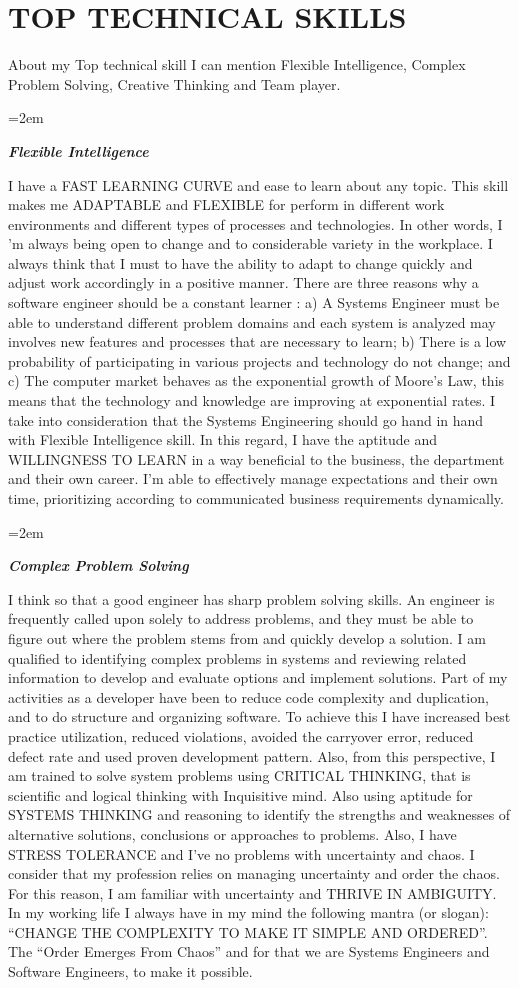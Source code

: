 \documentclass[paper=a4,fontsize=11pt]{scrartcl} %
\newlength{\spacebox}
\newcommand{\sepspace}{\vspace*{1em}}		%
\newcommand{\NewPart}[1]{\section*{\uppercase{#1}}}
\newcommand{\PersonalEntry}[2]{
		\noindent\hangindent=2em\hangafter=0 %
		\parbox{\spacebox}{        %
		\textit{#1}}		       %
		\hspace{1.5em} #2 \par}    %
\newcommand{\SkillsEntry}[2]{      %
		\noindent\hangindent=2em\hangafter=0 %
		\parbox{\spacebox}{        %
		\textit{#1}}			   %
		\hspace{1.5em} #2 \par}    %
\begin{document}
\NewPart{Top Technical Skills}{
About my Top technical skill I can mention Flexible Intelligence, Complex Problem Solving, Creative Thinking and Team player.
}

\sepspace

\SkillsEntry{\large{\textbf{Flexible Intelligence}}}{
I have a FAST LEARNING CURVE and ease to learn about any topic. This skill makes me ADAPTABLE and FLEXIBLE for perform in different work environments and different types of processes and technologies. In other words, I 'm always being open to change and to considerable variety in the workplace. I always think that I must to have the ability to adapt to change quickly and adjust work accordingly in a positive manner. There are three reasons why a software engineer should be a constant learner : a) A Systems Engineer must be able to understand different problem domains and each system is analyzed may involves new features and processes that are necessary to learn;  b) There is a low probability of participating in various projects and technology do not change; and c) The computer market behaves as the exponential growth of Moore's Law, this means that the technology and knowledge are improving at exponential rates. I take into consideration that the Systems Engineering should go hand in hand with Flexible Intelligence skill. In this regard, I have the aptitude and WILLINGNESS TO LEARN in a way beneficial to the business, the department and their own career. I'm able to effectively manage expectations and their own time, prioritizing according to communicated business requirements dynamically. 
}

\sepspace

\SkillsEntry{\large{\textbf{Complex Problem Solving}}}{
I think so that a good engineer has sharp problem solving skills. An engineer is frequently called upon solely to address problems, and they must be able to figure out where the problem stems from and quickly develop a solution. I am qualified to identifying complex problems in systems and reviewing related information to develop and evaluate options and implement solutions. Part of my activities as a developer have been to reduce code complexity and duplication, and to do structure and organizing software. To achieve this I have increased best practice utilization, reduced violations, avoided the carryover error, reduced defect rate and used proven development pattern. Also, from this perspective, I am trained to solve system problems using CRITICAL THINKING, that is scientific and logical thinking with Inquisitive mind. Also using aptitude for SYSTEMS THINKING and reasoning to identify the strengths and weaknesses of alternative solutions, conclusions or approaches to problems. Also, I have STRESS TOLERANCE and I've no problems with uncertainty and chaos. I consider that my profession relies on managing uncertainty and order the chaos. For this reason, I am familiar with uncertainty and THRIVE IN AMBIGUITY. In my working life I always have in my mind the following mantra (or slogan): “CHANGE THE COMPLEXITY TO MAKE IT SIMPLE AND ORDERED”. The “Order Emerges From Chaos” and for that we are Systems Engineers and Software Engineers, to make it possible.
}
\end{document}
